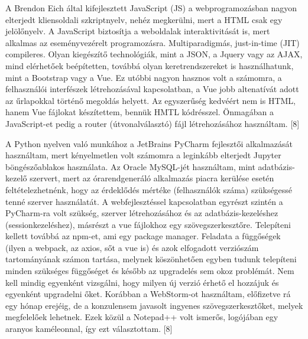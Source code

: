 A Brendon Eich által kifejlesztett JavaScript (JS) a webprogramozásban nagyon elterjedt
kliensoldali szkriptnyelv, nehéz megkerülni, mert a HTML csak egy jelölőnyelv. A JavaScript 
biztosítja a weboldalak interaktivitását is, mert alkalmas az eseményvezérelt programozásra. 
Multiparadigmás, just-in-time (JIT) compileres. Olyan kiegészítő technológiák, mint a JSON, 
a Jquery vagy az AJAX, mind elérhetőek beépítetten, továbbá olyan keretrendszereket is 
használhatunk, mint a Bootstrap vagy a Vue. Ez utóbbi nagyon hasznos volt a számomra, a 
felhasználói interfészek létrehozásával kapcsolatban, a Vue jobb altenatívát adott az 
űrlapokkal történő megoldás helyett. Az egyszerűség kedvéért nem is HTML, hanem Vue fájlokat
készítettem, bennük HMTL kódrésszel. Önmagában a JavaScript-et pedig a router 
(útvonalválasztó) fájl létrehozásához használtam. [8]


A Python nyelven való munkához a JetBrains PyCharm fejlesztői alkalmazását használtam, mert kényelmetlen volt számomra a leginkább elterjedt Jupyter böngészőablakos használata. Az Oracle MySQL-jét használtam, mint adatbázis-kezelő szervert, mert az órarendgeneráló alkalmazás piacra kerülése esetén feltételezhetnénk, hogy az érdeklődés mértéke (felhasználók száma) szükségessé tenné szerver használatát. A webfejlesztéssel kapcsolatban egyrészt szintén a PyCharm-ra volt szükség, szerver létrehozásához és az adatbázis-kezeléshez (sessionkezeléshez), másrészt a vue fájlokhoz egy szövegszerkesztőre. Telepíteni kellett továbbá az npm-et, ami egy package manager. Feladata a függőségek (ilyen a webpack, az axios, sőt a vue is) és azok elfogadott verziószám tartományának számon tartása, melynek köszönhetően egyben tudunk telepíteni minden szükséges függőséget és később az upgradelés sem okoz problémát. Nem kell mindig egyenként vizsgálni, hogy milyen új verzió érhető el hozzájuk és egyenként upgradelni őket. Korábban a WebStorm-ot használtam, előfizetve rá egy hónap erejéig, de a konzulensem javasolt ingyenes szövegszerkesztőket, melyek megfelelőek lehetnek. Ezek közül a Notepad++ volt ismerős, logójában egy aranyos kaméleonnal, így ezt választottam. [8]


